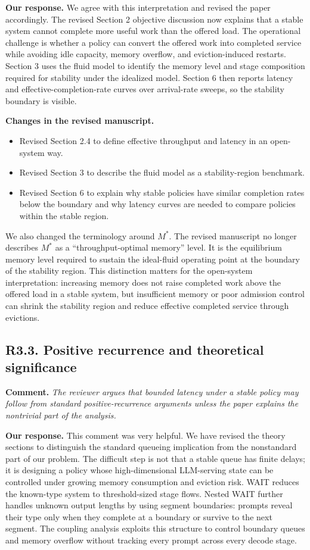 \documentclass[11pt]{article}
\newcommand{\comment}[1]{%
  \vspace{0.25em}
  \noindent\textbf{Comment.} \emph{#1}
}
\newcommand{\response}{\vspace{0.25em}\noindent\textbf{Our response.} }
\newcommand{\changes}{\vspace{0.25em}\noindent\textbf{Changes in the revised manuscript.} }
\begin{document}
\response We agree with this interpretation and revised the paper accordingly. The revised Section 2 objective discussion now explains that a stable system cannot complete more useful work than the offered load. The operational challenge is whether a policy can convert the offered work into completed service while avoiding idle capacity, memory overflow, and eviction-induced restarts. Section 3 uses the fluid model to identify the memory level and stage composition required for stability under the idealized model. Section 6 then reports latency and effective-completion-rate curves over arrival-rate sweeps, so the stability boundary is visible.

\changes
\begin{itemize}
    \item Revised Section 2.4 to define effective throughput and latency in an open-system way.
    \item Revised Section 3 to describe the fluid model as a stability-region benchmark.
    \item Revised Section 6 to explain why stable policies have similar completion rates below the boundary and why latency curves are needed to compare policies within the stable region.
\end{itemize}

\vspace{0.25em}
\noindent We also changed the terminology around \(M^*\). The revised manuscript no longer describes \(M^*\) as a ``throughput-optimal memory'' level. It is the equilibrium memory level required to sustain the ideal-fluid operating point at the boundary of the stability region. This distinction matters for the open-system interpretation: increasing memory does not raise completed work above the offered load in a stable system, but insufficient memory or poor admission control can shrink the stability region and reduce effective completed service through evictions.

\subsection*{R3.3. Positive recurrence and theoretical significance}

\comment{The reviewer argues that bounded latency under a stable policy may follow from standard positive-recurrence arguments unless the paper explains the nontrivial part of the analysis.}

\response This comment was very helpful. We have revised the theory sections to distinguish the standard queueing implication from the nonstandard part of our problem. The difficult step is not that a stable queue has finite delays; it is designing a policy whose high-dimensional LLM-serving state can be controlled under growing memory consumption and eviction risk. WAIT reduces the known-type system to threshold-sized stage flows. Nested WAIT further handles unknown output lengths by using segment boundaries: prompts reveal their type only when they complete at a boundary or survive to the next segment. The coupling analysis exploits this structure to control boundary queues and memory overflow without tracking every prompt across every decode stage.
\end{document}
